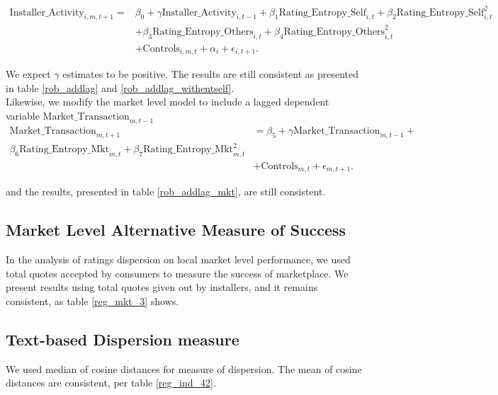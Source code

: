 \documentclass[msom,blindrev]{informs3}
\begin{document}
\begin{align}  \nonumber
\text{Installer\_Activity}_{i,m,t+1}=&\beta_{0}+\gamma \text{Installer\_Activity}_{i,t-1}+\beta_{1} \text{Rating\_Entropy\_Self}_{i,t}+\beta_{2} \text{Rating\_Entropy\_Self}_{i,t}^ {2}
\\ \nonumber
&+\beta_{3} \text{Rating\_Entropy\_Others}_{i,t}  +\beta_{4}\text{Rating\_Entropy\_Others}_{i,t}^{2} \\
&+ \text{Controls}_{i,m,t}+ \alpha_{i} + \epsilon_{i,t+1}.
\end{align}

We expect $\gamma$ estimates to be positive. The results are still consistent as presented in table \ref{rob_addlag} and \ref{rob_addlag_withentself}.\\

Likewise, we modify the market level model to include a lagged dependent variable $\text{Market\_Transaction}_{m,t-1}$\\
\begin{align} \nonumber
\text{Market\_Transaction}_{m,t+1} & =\beta_{5} + \gamma \text{Market\_Transaction}_{m,t-1}+\\\beta_{6}\text{Rating\_Entropy\_Mkt}_{m,t}+ \beta_{7}\text{Rating\_Entropy\_Mkt}_{m,t} ^2\\\nonumber
&+ \text{Controls}_{m,t}  +\epsilon_{m,t+1}.
\end{align}

and the results, presented in table \ref{rob_addlag_mkt}, are still consistent.




\subsection{Market Level Alternative Measure of Success}

In the analysis of ratings dispersion on local market level performance, we used total quotes accepted by consumers to measure the success of marketplace. We present results using total quotes given out by installers, and it remains consistent, as table \ref{reg_mkt_3} shows.

\subsection{Text-based Dispersion measure}

We used median of cosine distances for measure of dispersion. The mean of cosine distances are consistent, per table \ref{reg_ind_42}.
\end{document}
